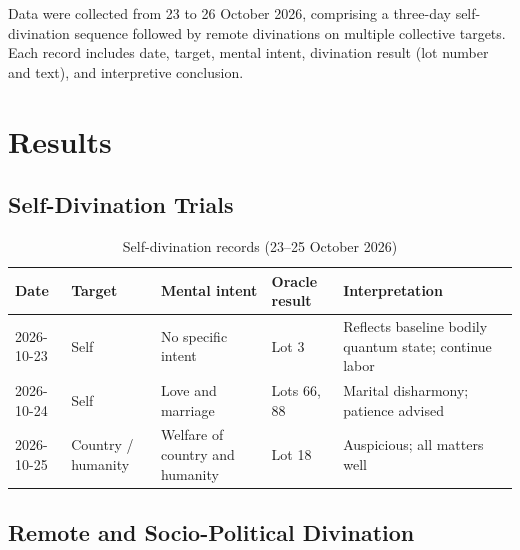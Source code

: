 \documentclass[11pt,a4paper]{article}
\begin{document}
Data were collected from 23 to 26 October 2026, comprising a three-day self-divination sequence followed by remote divinations on multiple collective targets. Each record includes date, target, mental intent, divination result (lot number and text), and interpretive conclusion.


\section{Results}

\subsection{Self-Divination Trials}

\begin{table}[htbp]
  \centering
  \caption{Self-divination records (23--25 October 2026)}
  \label{tab:self}
  \begin{tabular}{@{}llllp{5.5cm}@{}}
    \toprule
    \textbf{Date} & \textbf{Target} & \textbf{Mental intent} & \textbf{Oracle result} & \textbf{Interpretation} \\
    \midrule
    2026-10-23 & Self & No specific intent & Lot 3 & Reflects baseline bodily quantum state; continue labor \\
    2026-10-24 & Self & Love and marriage & Lots 66, 88 & Marital disharmony; patience advised \\
    2026-10-25 & Country / humanity & Welfare of country and humanity & Lot 18 & Auspicious; all matters well \\
    \bottomrule
  \end{tabular}
\end{table}

\subsection{Remote and Socio-Political Divination}
\end{document}
